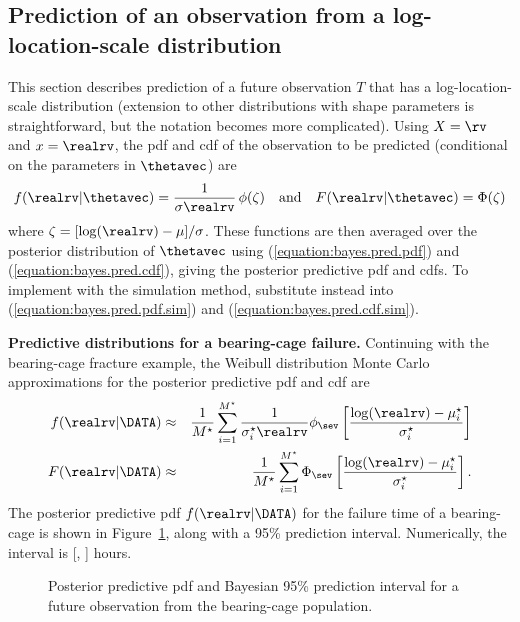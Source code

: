 \subsection{Prediction of an observation from a log-location-scale
distribution}
This section describes prediction of a future observation
$T$ that has a log-location-scale
distribution (extension to other distributions with
shape parameters is straightforward, but the notation
becomes more complicated).
Using $X=\rv$ and $x=\realrv$,
the pdf and cdf of the observation to be predicted
(conditional on the parameters in $\thetavec$) are
\begin{equation}
\label{equation:basic.cdf}
f(\realrv|\thetavec)=\frac{1}{\sigma \realrv}\, \phi(\zeta)
\quad {\rm and} \quad
F(\realrv|\thetavec)=\Phi(\zeta)
\end{equation}
where $\zeta=[\log(\realrv)-\mu]/\sigma$.  These functions are then
averaged over the posterior distribution of $\thetavec$ using
(\ref{equation:bayes.pred.pdf}) and (\ref{equation:bayes.pred.cdf}), giving
the posterior predictive pdf and cdfs. To implement
with the simulation
method, substitute instead into
(\ref{equation:bayes.pred.pdf.sim}) and
(\ref{equation:bayes.pred.cdf.sim}).
\begin{example}
{\bf Predictive distributions for a bearing-cage failure.}
Continuing with the bearing-cage fracture example, the Weibull distribution
Monte Carlo approximations for the posterior predictive pdf and cdf are
\begin{eqnarray*}
f(\realrv |\DATA) & \approx & \frac{1}{M^{\star}} \sum_{i=1}^{M^{\star}}
\frac{1}{\sigma_{i}^{\star} \realrv} \phi_{\sev}
\left [
\frac{\log(\realrv)-\mu_{i}^{\star}}
     {\sigma_{i}^{\star}}
\right ]
\\
F(\realrv|\DATA) & \approx & \frac{1}{M^{\star}} \sum_{i=1}^{M^{\star}}\Phi_{\sev}
\left [
\frac{\log(\realrv)-\mu_{i}^{\star}}
     {\sigma_{i}^{\star}}
\right ].
\end{eqnarray*}
The posterior predictive pdf $f(\realrv | \DATA)$ for the failure time of a
bearing-cage is shown in Figure~\ref{figure:pred.postx.bcage.ps},
along with a 95\% prediction interval. Numerically, the interval is
[, \quad  {}] hours.
\begin{figure}
\caption{Posterior predictive pdf and Bayesian 95\% 
prediction interval for a future observation from the bearing-cage
population.}
\label{figure:pred.postx.bcage.ps}
\end{figure}
\end{example}

